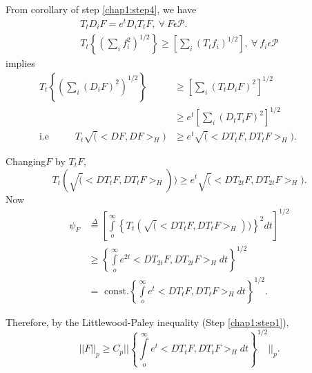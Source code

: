  From corollary of step \ref{chap1:step4}, we have 
 \begin{gather*}
   T_t D_iF =e^t D_i T_t F, ~\forall~ F \epsilon  \mathcal{P}. \\
   T_t \left\{ \left(\sum_i f^2_i\right)^{1/2} \right\} \geq
   \left[\sum_i \left(T_t f_i\right)^{1/2}\right],
   ~\forall~ f_i \epsilon  \mathcal{P} 
 \end{gather*} 
  implies
 \begin{align*}
  T_t \left\{ \left(\sum_i ( D_i F)^2\right)^{1/2} \right\} &\geq
  \left[\sum_i (T_t D_i F)^{2}\right]^{1/2}\\ 
  & \geq e^t \left[\sum_i (D_t T_i F)^{2}\right]^{1/2}\\
\text{i.e } \hspace{1cm} T_t \surd (< DF, DF >_H) & \geq e^t \surd (<
DT_t  F, DT_t F>_H).  \hspace{1cm} 
 \end{align*}
  
  Changing\pageoriginale $F$ by $T_t F$,
  $$
  T_t (\surd (< DT_t F, DT_t F >_H)) \geq e^t \surd (<DT_{2t} F,
  DT_{2t}F >_H). 
  $$
    Now
\begin{align*}
   \psi _F & {\overset{\Delta}=} \left[\int\limits_o ^\infty \left\{ T_t(\surd
     (< DT_t F, DT_t F>_H)) \right\}^2 dt\right]^{1/2}\\ 
   & \geq \left\{ \int\limits^\infty _o e^{2t} < DT_{2t} F, DT_{2t} F
   >_H dt \right\}^{1/2}\\
   & = \text{ const}. \left\{ \int \limits^ \infty _o e^{t} < DT_{t}F, D
   T_{t} F >_H dt \right\}^{1/2}. 
\end{align*}  
  
Therefore, by the Littlewood-Paley inequality (Step \ref{chap1:step1}),
  \begin{equation*}
    || F || _p \geq C_p || \left\{ \int \limits ^ \infty _oe^{t} < DT_{t}
    F,  DT_{t} F >_H dt \right\}^{1/2} ||_p . \tag{1.19}\label{eq1.19} 
  \end{equation*}
  
